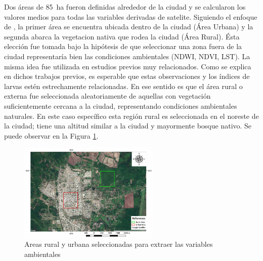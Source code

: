   \par Dos áreas de \SI{85}{\hectare} fueron definidas alrededor de la ciudad
    y se calcularon los valores medios para todas las variables derivadas de
    satelite. Siguiendo el enfoque de
    \cite{models_predicting, dynamics_of_dengue, temporal_modeling},
    la primer área se encuentra ubicada dentro de la ciudad
    (Área Urbana) y la segunda abarca la vegetacion nativa que rodea la ciudad
    (Área Rural). Ésta elección fue tomada bajo la hipótesis de que seleccionar
    una zona fuera de la ciudad representaría bien las condiciones ambientales
    (NDWI, NDVI, LST). La misma idea fue utilizada en estudios previos muy
    relacionados. Como se explica en dichos trabajos previos, es esperable
    que estas observaciones y los índices de larvas
    estén estrechamente relacionadas. En ese sentido es que el área rural o
    externa fue seleccionada aleatoriamente de aquellas con vegetación suficientemente
    cercana a la ciudad, representando condiciones ambientales naturales.
    En este caso específico esta región rural es seleccionada en el
    noreste de la ciudad; tiene una altitud similar a la ciudad y mayormente
    bosque nativo. Se puede observar en la Figura \ref{fig:zones}.
    \begin{figure}[hbt]
    \centering%
    \includegraphics[width=0.6\textwidth]{images/zones}%
    \caption{Areas rural y urbana seleccionadas para extraer las variables ambientales}\label{fig:zones}
    \end{figure}


